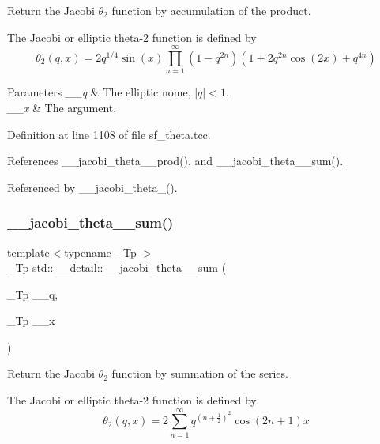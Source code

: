 Return the Jacobi $ \theta_2 $ function by accumulation of the product.

The Jacobi or elliptic theta-\/2 function is defined by \[ \theta_2(q,x) = 2 q^{1/4} \sin(x) \prod_{n=1}^{\infty} (1 - q^{2n})(1 + 2q^{2n}\cos(2x) + q^{4n}) \]


\begin{DoxyParams}{Parameters}
{\em \+\_\+\+\_\+q} & The elliptic nome, $ |q| < 1 $. \\
\hline
{\em \+\_\+\+\_\+x} & The argument. \\
\hline
\end{DoxyParams}


Definition at line 1108 of file sf\+\_\+theta.\+tcc.



References \+\_\+\+\_\+jacobi\+\_\+theta\+\_\+\_\+prod(), and \+\_\+\+\_\+jacobi\+\_\+theta\+\_\+\_\+sum().



Referenced by \+\_\+\+\_\+jacobi\+\_\+theta\+\_().

\mbox{\label{namespacestd_1_1____detail_a6eba88f5f854974b7fe7445e9b11a0e0}} 
\subsubsection{\texorpdfstring{\+\_\+\+\_\+jacobi\+\_\+theta\+\_\+\_\+sum()}{\_\_jacobi\_theta\_2\_sum()}}
{\footnotesize\ttfamily template$<$typename \+\_\+\+Tp $>$ \\
\+\_\+\+Tp std\+::\+\_\+\+\_\+detail\+::\+\_\+\+\_\+jacobi\+\_\+theta\+\_\+\_\+sum (\begin{DoxyParamCaption}\item[{\+\_\+\+Tp}]{\+\_\+\+\_\+q,  }\item[{\+\_\+\+Tp}]{\+\_\+\+\_\+x }\end{DoxyParamCaption})}

Return the Jacobi $ \theta_2 $ function by summation of the series.

The Jacobi or elliptic theta-\/2 function is defined by \[ \theta_2(q,x) = 2\sum_{n=1}^{\infty} q^{(n+\frac{1}{2})^2}\cos{(2n+1)x} \]



